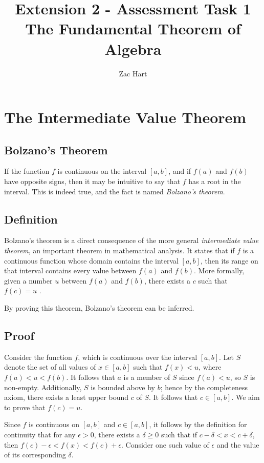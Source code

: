 \documentclass[12pt]{article}
\author{Zac Hart}
\title{{\bf Extension 2 - Assessment Task 1}\\{\large The Fundamental Theorem of Algebra}}
\begin{document}
\maketitle

\section{The Intermediate Value Theorem}

\subsection*{Bolzano's Theorem}

If the function $f$ is continuous on the interval $[a,b]$, and if $f(a)$ and $f(b)$ have opposite signs, then it may be intuitive to say that $f$ has a root in the interval. This is indeed true, and the fact is named \textit{Bolzano's theorem}.

\subsection*{Definition}

Bolzano's theorem is a direct consequence of the more general \textit{intermediate value theorem}, an important theorem in mathematical analysis. It states that if $f$ is a continuous function whose domain contains the interval $[a,b]$, then its range on that interval contains every value between $f(a)$ and $f(b)$. More formally, given a number $u$ between $f(a)$ and $f(b)$, there exists a $c$ such that $f(c) = u$ \parencite{wikipedia-ivt}. \smallskip

By proving this theorem, Bolzano's theorem can be inferred.

\subsection*{Proof}

Consider the function $f$, which is continuous over the interval $[a,b]$. Let $S$ denote the set of all values of $x \in [a,b]$ such that $f(x) < u$, where $f(a) < u < f(b)$. It follows that $a$ is a member of $S$ since $f(a) < u$, so $S$ is non-empty. Additionally, $S$ is bounded above by $b$; hence by the completeness axiom, there exists a least upper bound $c$ of $S$. It follows that $c \in [a,b]$. We aim to prove that $f(c) = u$. \medskip

Since $f$ is continuous on $[a,b]$ and $c \in [a,b]$, it follows by the definition for continuity that for any $\epsilon > 0$, there exists a $\delta \ge 0$ such that if $c - \delta < x < c + \delta$, then $f(c) - \epsilon < f(x) < f(c) + \epsilon$. Consider one such value of $\epsilon$ and the value of its corresponding $\delta$.
\end{document}
